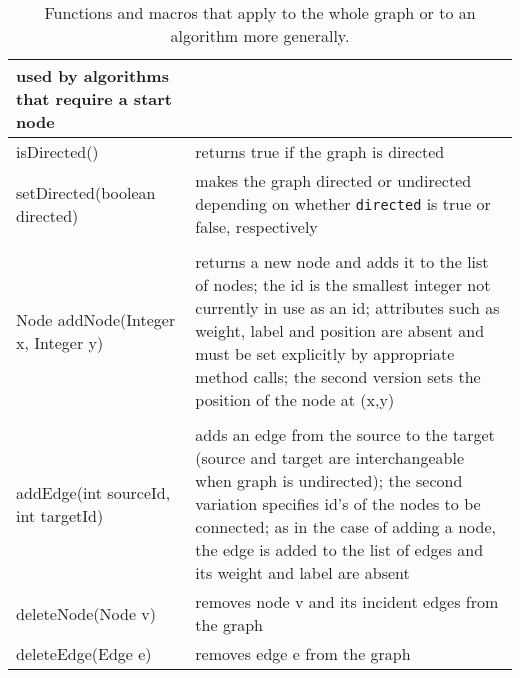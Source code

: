 \begin{table}
\begin{tabular}{| m{} | m{} |}
    used by algorithms that require a start node
    \\ \hline
    \textsf{isDirected()}
    &
    returns true if the graph is directed
    \\ \hline
    \textsf{setDirected(boolean directed)}
    &
    makes the graph directed or undirected depending on whether \texttt{directed}
    is true or false, respectively
    \\ \hline
    \shortstack[l]{
      \textsf{Node addNode()}\\
      \textsf{Node addNode(Integer x, Integer y)}
    }
    &
    returns a new node and adds it to the list of nodes;
    the id is the smallest integer not currently in use as an id;
    attributes such as weight, label and position are absent and must be set explicitly
    by appropriate method calls;
    the second version sets the position of the node at \textsf{(x,y)}
    \\ \hline
    \raisebox{-5ex}{
      \shortstack[l]{
        \textsf{addEdge(Node source, Node target)}\\
        \textsf{addEdge(int sourceId, int targetId)}
      }
    }
    &
    adds an edge from the source to
    the target (source and target are interchangeable when graph is undirected);
    the second variation specifies id's of the nodes to be connected;
    as in the case of adding a node, the edge is added to the list of edges and
    its weight and label are absent
    \\ \hline
    \textsf{deleteNode(Node v)}
    &
    removes node \textsf{v} and its incident edges from the graph
    \\ \hline
    \textsf{deleteEdge(Edge e)}
    &
    removes edge \textsf{e} from the graph
    \\ \hline
  \end{tabular}
  \caption{Functions and macros that apply to the whole graph or to
    an algorithm more generally.}
  \label{tab:graph_functions}
\end{table}

